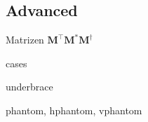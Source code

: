\subsection{Advanced}

\begin{frame}{Matrizen}
  $\mathbf{M}^\top \mathbf{M}^* \mathbf{M}^\dagger$
\end{frame}

\begin{frame}{cases}
\end{frame}

\begin{frame}{underbrace}
\end{frame}

\begin{frame}{phantom, hphantom, vphantom}
\end{frame}

